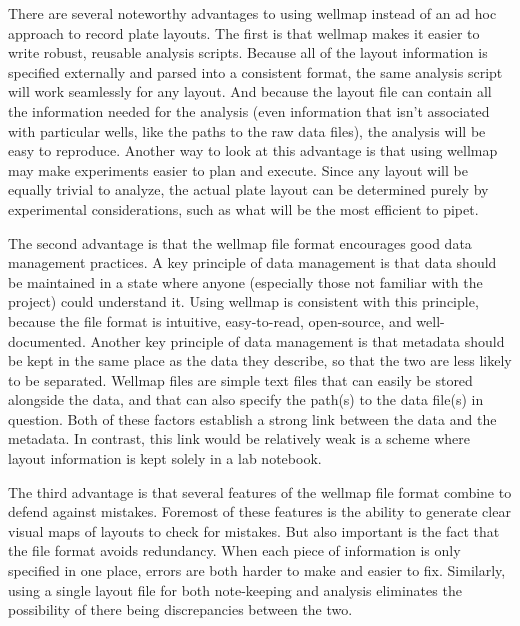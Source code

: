 \documentclass{bmcart}
\begin{document}
There are several noteworthy advantages to using wellmap instead
of an ad hoc approach to record plate layouts. The first is that wellmap
makes it easier to write robust, reusable analysis scripts. Because
all of the layout information is specified externally and parsed into
a consistent format, the same analysis script will work seamlessly
for any layout. And because the layout file can contain all the information
needed for the analysis (even information that isn't associated with
particular wells, like the paths to the raw data files), the analysis
will be easy to reproduce. Another way to look at this advantage is
that using wellmap may make experiments easier to plan and execute.
Since any layout will be equally trivial to analyze, the actual plate
layout can be determined purely by experimental considerations, such
as what will be the most efficient to pipet. 

The second advantage is that the wellmap file format encourages good
data management practices. A key principle of data management is that
data should be maintained in a state where anyone (especially those
not familiar with the project) could understand it. Using wellmap
is consistent with this principle, because the file format is intuitive,
easy-to-read, open-source, and well-documented. Another key principle
of data management is that metadata should be kept in the same place
as the data they describe, so that the two are less likely to be separated.
Wellmap files are simple text files that can easily be stored alongside
the data, and that can also specify the path(s) to the data file(s)
in question. Both of these factors establish a strong link between
the data and the metadata. In contrast, this link would be relatively
weak is a scheme where layout information is kept solely in a lab
notebook.

The third advantage is that several features of the wellmap file
format combine to defend against mistakes. Foremost of these features
is the ability to generate clear visual maps of layouts to check for
mistakes. But also important is the fact that the file format avoids
redundancy. When each piece of information is only specified in one
place, errors are both harder to make and easier to fix. Similarly,
using a single layout file for both note-keeping and analysis eliminates
the possibility of there being discrepancies between the two.
\end{document}
